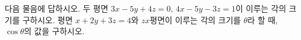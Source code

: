 다음 물음에 답하시오.
 두 평면 $3x-5y+4z=0$, $4x-5y-3z=1$이 이루는 각의 크기를 구하시오.
 평면 $x+2y+3z=4$와 $zx$평면이 이루는 각의 크기를 $\theta$라 할 때, $\cos\theta$의 값을 구하시오.
